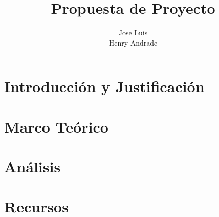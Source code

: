\documentclass[10pt,a4paper]{article}
\title{Propuesta de Proyecto}
\author{Jose Luis\\Henry Andrade}
\begin{document}
\maketitle
\section{Introducción y Justificación}
\section{Marco Teórico}
\section{Análisis}
\section{Recursos}
\end{document}
